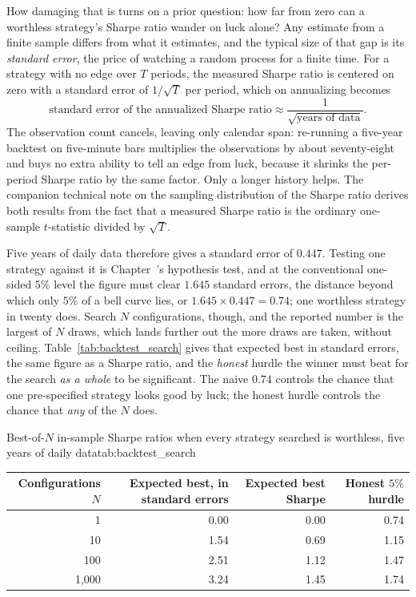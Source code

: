\documentclass[../ai_in_finance]{subfiles}
\begin{document}
How damaging that is turns on a prior question: how far from zero can a worthless strategy's Sharpe ratio wander on luck alone? Any estimate from a finite sample differs from what it estimates, and the typical size of that gap is its \emph{standard error}, the price of watching a random process for a finite time. For a strategy with no edge over $T$ periods, the measured Sharpe ratio is centered on zero with a standard error of $1/\sqrt{T}$ per period, which on annualizing becomes
\begin{equation}
\text{standard error of the annualized Sharpe ratio} \approx \frac{1}{\sqrt{\text{years of data}}}.
\label{eq:algotrading-sharpe-se}
\end{equation}
The observation count cancels, leaving only calendar span: re-running a five-year backtest on five-minute bars multiplies the observations by about seventy-eight and buys no extra ability to tell an edge from luck, because it shrinks the per-period Sharpe ratio by the same factor. Only a longer history helps. The companion technical note on the sampling distribution of the Sharpe ratio derives both results from the fact that a measured Sharpe ratio is the ordinary one-sample $t$-statistic divided by $\sqrt{T}$.

Five years of daily data therefore gives a standard error of $0.447$. Testing one strategy against it is Chapter~'s hypothesis test, and at the conventional one-sided $5\%$ level the figure must clear $1.645$ standard errors, the distance beyond which only $5\%$ of a bell curve lies, or $1.645 \times 0.447 = 0.74$; one worthless strategy in twenty does. Search $N$ configurations, though, and the reported number is the largest of $N$ draws, which lands further out the more draws are taken, without ceiling. Table~\ref{tab:backtest_search} gives that expected best in standard errors, the same figure as a Sharpe ratio, and the \emph{honest} hurdle the winner must beat for the search \emph{as a whole} to be significant. The naive $0.74$ controls the chance that one pre-specified strategy looks good by luck; the honest hurdle controls the chance that \emph{any} of the $N$ does.

\begin{booktable}[htbp]{Best-of-$N$ in-sample Sharpe ratios when every strategy searched is worthless, five years of daily data}{tab:backtest_search}
\begin{tabular}{rrrr}
\toprule
Configurations $N$ & Expected best, in standard errors & Expected best Sharpe & Honest $5\%$ hurdle \\
\midrule
1    & 0.00 & 0.00 & 0.74 \\
10   & 1.54 & 0.69 & 1.15 \\
100  & 2.51 & 1.12 & 1.47 \\
1{,}000 & 3.24 & 1.45 & 1.74 \\
\bottomrule
\end{tabular}
\end{booktable}
\end{document}
